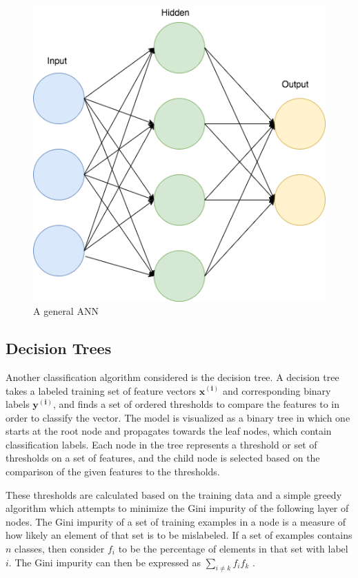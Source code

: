 \begin{figure}[htb]
\centering
\includegraphics[scale=.50]{figures/NN}
\caption{A general ANN}
\label{fig:tamu-fig3}
\end{figure}


\subsection{Decision Trees}

Another classification algorithm considered is the decision tree. 
A decision tree takes a labeled training set of feature vectors $\mathbf{x^{(i)}}$ and corresponding binary labels $\mathbf{y^{(i)}}$, and finds a set of ordered thresholds to compare the features to in order to classify the vector.
The model is visualized as a binary tree in which one starts at the root node and propagates towards the leaf nodes, which contain classification labels.
Each node in the tree represents a threshold or set of thresholds on a set of features, and the child node is selected based on the comparison of the given features to the thresholds.

These thresholds are calculated based on the training data and a simple greedy algorithm which attempts to minimize the Gini impurity of the following layer of nodes.
The Gini impurity of a set of training examples in a node is a measure of how likely an element of that set is to be mislabeled.
If a set of examples contains $n$ classes, then consider $f_i$ to be the percentage of elements in that set with label $i$.
The Gini impurity can then be expressed as $\sum_{i \not = k} f_if_k$ .

